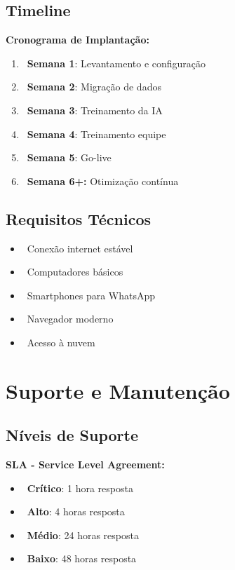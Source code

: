 \documentclass[11pt,a4paper]{article}
\newcommand{\sectiontitle}[1]{\section{\color{oraldentsblue}#1}}
\begin{document}
\subsection{Timeline}
\begin{tcolorbox}[colback=blue!5!white,colframe=oraldentsblue]
\textbf{Cronograma de Implantação:}
\begin{enumerate}
    \item \faClipboardCheck\ \textbf{Semana 1}: Levantamento e configuração
    \item \faDatabase\ \textbf{Semana 2}: Migração de dados
    \item \faRobot\ \textbf{Semana 3}: Treinamento da IA
    \item \faUsers\ \textbf{Semana 4}: Treinamento equipe
    \item \faRocket\ \textbf{Semana 5}: Go-live
    \item \faChartLine\ \textbf{Semana 6+:} Otimização contínua
\end{enumerate}
\end{tcolorbox}

\subsection{Requisitos Técnicos}
\begin{itemize}
    \item \faWifi\ Conexão internet estável
    \item \faDesktop\ Computadores básicos
    \item \faMobileAlt\ Smartphones para WhatsApp
    \item \faChrome\ Navegador moderno
    \item \faCloud\ Acesso à nuvem
\end{itemize}

\sectiontitle{Suporte e Manutenção}

\subsection{Níveis de Suporte}
\begin{tcolorbox}[colback=green!5!white,colframe=successgreen]
\textbf{SLA - Service Level Agreement:}
\begin{itemize}
    \item \faExclamationTriangle\ \textbf{Crítico}: 1 hora resposta
    \item \faExclamationCircle\ \textbf{Alto}: 4 horas resposta
    \item \faInfoCircle\ \textbf{Médio}: 24 horas resposta
    \item \faQuestionCircle\ \textbf{Baixo}: 48 horas resposta
\end{itemize}
\end{tcolorbox}
\end{document}
